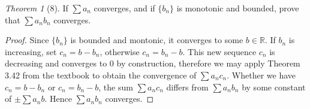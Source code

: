 \documentclass[12pt]{article}
\theoremstyle{remark}
\theoremstyle{named}
\newtheorem*{theorem}{Theorem}
\begin{document}
\begin{theorem}[8]
    If \(\sum a_n\) converges, and if \(\{b_n\}\) is monotonic and bounded, prove that \(\sum a_n b_n\) converges. 
\end{theorem}

\begin{proof}
    Since \(\{b_n\}\) is bounded and montonic, it converges to some \(b \in \mathbb R\). If \(b_n\) is increasing, set \(c_n = b - b_n\), otherwise \(c_n = b_n - b\). This new sequence \(c_n\) is decreasing and converges to \(0\) by construction, therefore we may apply Theorem 3.42 from the textbook to obtain the convergence of \(\sum a_n c_n\). 
    Whether we have \(c_n = b - b_n\) or \(c_n = b_n - b\), the sum \(\sum a_n c_n\) differs from \(\sum a_n b_n\) by some constant of \(\pm \sum a_n b\). Hence \(\sum a_n b_n\) converges.
\end{proof}
\end{document}
